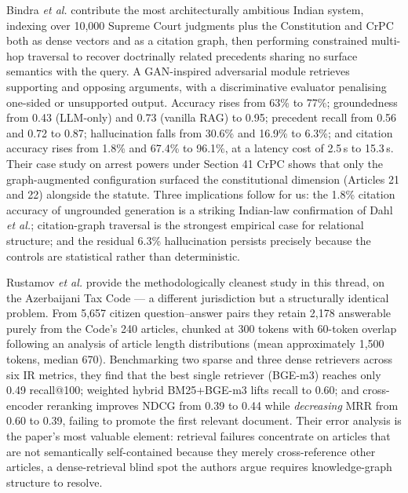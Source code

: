 \documentclass[conference]{IEEEtran}
\begin{document}
Bindra \textit{et al.} \cite{bindra2026} contribute the most architecturally ambitious Indian system, indexing over 10{,}000 Supreme Court judgments plus the Constitution and CrPC both as dense vectors and as a citation graph, then performing constrained multi-hop traversal to recover doctrinally related precedents sharing no surface semantics with the query. A GAN-inspired adversarial module retrieves supporting and opposing arguments, with a discriminative evaluator penalising one-sided or unsupported output. Accuracy rises from 63\% to 77\%; groundedness from 0.43 (LLM-only) and 0.73 (vanilla RAG) to 0.95; precedent recall from 0.56 and 0.72 to 0.87; hallucination falls from 30.6\% and 16.9\% to 6.3\%; and citation accuracy rises from 1.8\% and 67.4\% to 96.1\%, at a latency cost of 2.5\,s to 15.3\,s. Their case study on arrest powers under Section 41 CrPC shows that only the graph-augmented configuration surfaced the constitutional dimension (Articles 21 and 22) alongside the statute. Three implications follow for us: the 1.8\% citation accuracy of ungrounded generation is a striking Indian-law confirmation of Dahl \textit{et al.}; citation-graph traversal is the strongest empirical case for relational structure; and the residual 6.3\% hallucination persists precisely because the controls are statistical rather than deterministic.

Rustamov \textit{et al.} \cite{rustamov2025} provide the methodologically cleanest study in this thread, on the Azerbaijani Tax Code — a different jurisdiction but a structurally identical problem. From 5{,}657 citizen question--answer pairs they retain 2{,}178 answerable purely from the Code's 240 articles, chunked at 300 tokens with 60-token overlap following an analysis of article length distributions (mean approximately 1{,}500 tokens, median 670). Benchmarking two sparse and three dense retrievers across six IR metrics, they find that the best single retriever (BGE-m3) reaches only 0.49 recall@100; weighted hybrid BM25+BGE-m3 lifts recall to 0.60; and cross-encoder reranking improves NDCG from 0.39 to 0.44 while \emph{decreasing} MRR from 0.60 to 0.39, failing to promote the first relevant document. Their error analysis is the paper's most valuable element: retrieval failures concentrate on articles that are not semantically self-contained because they merely cross-reference other articles, a dense-retrieval blind spot the authors argue requires knowledge-graph structure to resolve.
\end{document}
